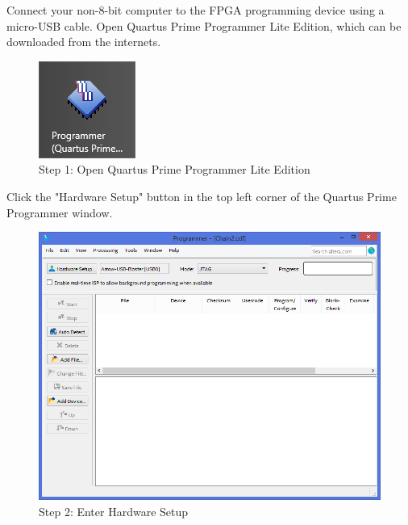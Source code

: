 Connect your non-8-bit computer to the FPGA programming device using a micro-USB cable.
Open Quartus Prime Programmer Lite Edition, which can be downloaded from the internets.

\begin{figure}
  \includegraphics[width=\linewidth]{images/max10_01.png}
  \caption{Step 1: Open Quartus Prime Programmer Lite Edition}
  \label{fig:max10_01}
\end{figure}

Click the "Hardware Setup" button in the top left corner of the Quartus Prime Programmer window.

\begin{figure}
  \includegraphics[width=\linewidth]{images/max10_02.png}
  \caption{Step 2: Enter Hardware Setup}
  \label{fig:max10_02}
\end{figure}


